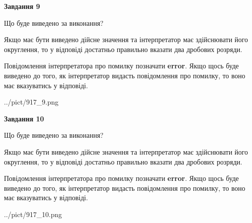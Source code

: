 \documentclass[12pt, ukrainian]{article}
\begin{document}
{\begin {Large}
{\begin {center}\textbf{Завдання 9}\end {center}}\par
Що буде виведено за виконання? \par

Якщо має бути виведено дійсне значення та інтерпретатор має здійснювати його округлення, 
то у відповіді достатньо правильно вказати два дробових розряди.

Повідомлення інтерпретатора про помилку позначати \textbf{error}.
Якщо щось буде виведено до того, як інтерпретатор видасть повідомлення про помилку, 
то воно має вказуватись у відповіді. \par

\begin{center}
	{../pict/917_9.png}
\end{center}
\newpage

{\begin {center}\textbf{Завдання 10}\end {center}}\par
Що буде виведено за виконання? \par

Якщо має бути виведено дійсне значення та інтерпретатор має здійснювати його округлення, 
то у відповіді достатньо правильно вказати два дробових розряди.

Повідомлення інтерпретатора про помилку позначати \textbf{error}.
Якщо щось буде виведено до того, як інтерпретатор видасть повідомлення про помилку, 
то воно має вказуватись у відповіді. \par

\begin{center}
	{../pict/917_10.png}
\end{center}
\newpage

\end {Large}}
\end{document}
